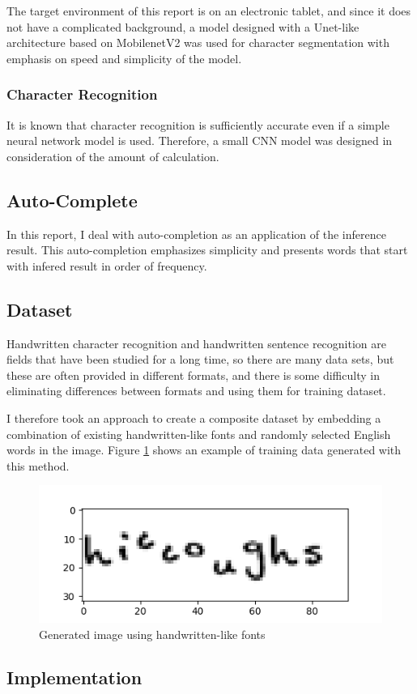 The target environment of this report is on an electronic tablet,
and since it does not have a complicated background,
a model designed with a Unet-like~\cite{ronneberger2015unet} architecture based on MobilenetV2\cite{s2018mobilenetv2} was
used for character segmentation with emphasis on speed and simplicity of the model.

\subsubsection{Character Recognition}

It is known that character recognition is sufficiently accurate even if
a simple neural network model is used. Therefore, a small CNN model was designed
in consideration of the amount of calculation.

\subsection{Auto-Complete}

In this report, I deal with auto-completion as an application of the inference result.
This auto-completion emphasizes simplicity and presents words
that start with infered result in order of frequency.

\subsection{Dataset}

Handwritten character recognition and handwritten sentence recognition are
fields that have been studied for a long time, so there are many data sets,
but these are often provided in different formats, and there is some difficulty
in eliminating differences between formats and using them for training dataset.

I therefore took an approach to create a composite dataset by
embedding a combination of existing handwritten-like fonts and
randomly selected English words in the image.
Figure \ref{fig:generated_image} shows an example of training data generated with this method.

\begin{figure}
    \centering
    \includegraphics[width=\linewidth]{images/generated_image.png}
    \caption{Generated image using handwritten-like fonts}
    \label{fig:generated_image}
\end{figure}

\subsection{Implementation}



